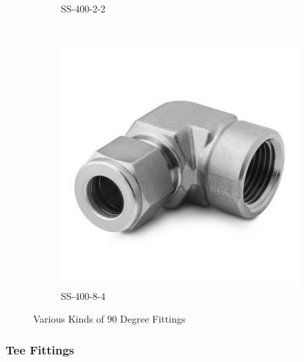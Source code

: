 \documentclass[a4paper,12pt,oneside]{article}
\begin{document}
\begin{appendices}
\begin{figure}[H]
\begin{subfigure}[b]{0.2\textwidth}
    \caption{SS-400-2-2}
    \end{subfigure}
    ~
    \begin{subfigure}[b]{0.2\textwidth}
    \centering
    \includegraphics[width=\textwidth]{appendix/img/interfaces/SS-400-8-4.jpg}
    \caption{SS-400-8-4}
    \end{subfigure}
    \caption{Various Kinds of 90 Degree Fittings}
    \label{Appx:Elbow_fittings}
\end{figure}


\subsubsection{Tee Fittings}


\end{appendices}
\end{document}
